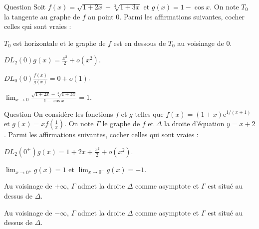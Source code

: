 \begin{multi}[multiple,feedback=
{Les développements à l'ordre \(2\) en \(0\) de \((1+t)^{\alpha}\) et de \(\cos (x)\) donnent :
\[\displaystyle DL_2(0)f(x)=\frac{x^2}{2}+o(x^2)\quad \mbox{et}\quad DL_2(0)g(x)=\frac{x^2}{2}+o(x^2).\]
D'abord, \(\displaystyle \lim _{x\to 0}\frac{\sqrt{1+2x}-\sqrt[3]{1+3x}}{1-\cos x}=1\). Ensuite, \(T_0\) est la droite d'équation \(y=0\). Or, au voisinage de \(0\), on a : \(\displaystyle f(x)-y\simeq \frac{x^2}{2}\geq 0\). Donc le graphe de \(f\) est situé au dessus de \(T_0\).
}]{Question}
Soit \(\displaystyle f(x)=\sqrt{1+2x}-\sqrt[3]{1+3x}\) et \(g(x)=1-\cos x\). On note \(T_0\) la tangente au graphe de \(f\) au point \(0\). Parmi les affirmations suivantes, cocher celles qui sont vraies :

    \item \(T_0\) est horizontale et le graphe de \(f\) est en dessous de \(T_0\) au voisinage de \(0\).
    \item* \(\displaystyle DL_2(0)g(x)=\frac{x^2}{2}+o(x^2)\).
    \item \(\displaystyle DL_0(0)\frac{f(x)}{g(x)}=0+o(1)\).
    \item* \(\displaystyle \lim _{x\to 0}\frac{\sqrt{1+2x}-\sqrt[3]{1+3x}}{1-\cos x}=1\).
\end{multi}


\begin{multi}[multiple,feedback=
{On a : \(\displaystyle g(x)=(1+x)\mathrm{e}^{x/(1+x)}\). Dans \(\displaystyle \mathrm{e}^u=1+u+\frac{u^2}{2}+o(u^2)\), on pose \(\displaystyle u=\frac{x}{1+x}=x-x^2+o(x^2)\). Ceci donne :
\[DL_2(0)g(x)=1+2x+\frac{x^2}{2}+o(x^2)\Rightarrow DL_1(+\infty)f(x)=x+2+\frac{1}{2x}+o\left(\frac{1}{x}\right).\]
Ainsi, au voisinage de \(+\infty\), \(\Gamma\) admet \(\Delta\) comme asymptote et \(\Gamma\) est situé au dessus de \(\Delta\) car \(\displaystyle f(x)-y=\frac{1}{2x}+o\left(\frac{1}{x}\right)\geq 0\) au voisinage de \(+\infty\). Au voisinage de \(-\infty\), \(\Gamma\) est situé en dessous de \(\Delta\) car \(\displaystyle f(x)-y=\frac{1}{2x}+o\left(\frac{1}{x}\right)\leq 0\) au voisinage de \(-\infty\).
}]{Question}
On considère les fonctions \(f\) et \(g\) telles que \(\displaystyle f(x)=(1+x)\mathrm{e}^{1/(x+1)}\) et \(\displaystyle g(x)=xf\left(\frac{1}{x}\right)\). On note \(\Gamma\) le graphe de \(f\) et \(\Delta\) la droite d'équation \(\displaystyle y=x+2\). Parmi les affirmations suivantes, cocher celles qui sont vraies :

    \item* \(\displaystyle DL_2(0^+)g(x)=1+2x+\frac{x^2}{2}+o(x^2)\).
    \item \(\displaystyle \lim _{x\to 0^+}g(x)=1\) et \(\displaystyle \lim _{x\to 0^-}g(x)=-1\).
    \item* Au voisinage de \(+\infty\), \(\Gamma\) admet la droite \(\Delta\) comme asymptote et \(\Gamma\) est situé au dessus de \(\Delta\).
    \item Au voisinage de \(-\infty\), \(\Gamma\) admet la droite \(\Delta\) comme asymptote et \(\Gamma\) est situé au dessus de \(\Delta\).
\end{multi}


